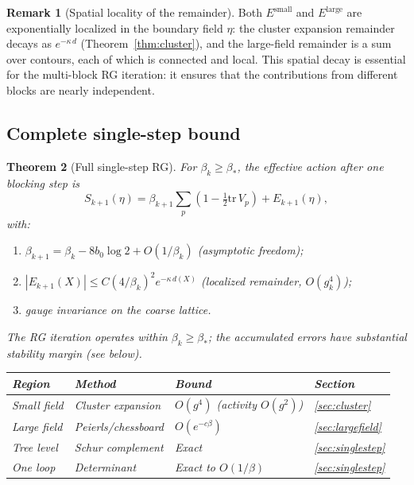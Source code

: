 \documentclass[11pt]{article}
\newtheorem{theorem}{Theorem}[section]
\theoremstyle{definition}
\newtheorem{remark}[theorem]{Remark}
\newcommand{\tr}{\mathrm{tr}}
\begin{document}
\begin{remark}[Spatial locality of the remainder]
Both $E^{\mathrm{small}}$ and $E^{\mathrm{large}}$ are exponentially
localized in the boundary field $\eta$: the cluster expansion
remainder decays as $e^{-\kappa\,d}$ (Theorem~\ref{thm:cluster}), and
the large-field remainder is a sum over contours, each of which is
connected and local.  This spatial decay is essential for the
multi-block RG iteration: it ensures that the contributions from
different blocks are nearly independent.
\end{remark}

\subsection{Complete single-step bound}

\begin{theorem}[Full single-step RG]\label{thm:singlestep}
For $\beta_k\ge\beta_*$, the effective action after one blocking step is
\begin{equation}
S_{k+1}(\eta)=\beta_{k+1}\sum_p(1-\tfrac{1}{2}\tr\,V_p)+E_{k+1}(\eta),
\end{equation}
with:
\begin{enumerate}[nosep,label=(\roman*)]
\item $\beta_{k+1}=\beta_k-8b_0\log 2+O(1/\beta_k)$
(asymptotic freedom);
\item $|E_{k+1}(X)|\le C(4/\beta_k)^2 e^{-\kappa\,d(X)}$
(localized remainder, $O(g_k^4)$);
\item gauge invariance on the coarse lattice.
\end{enumerate}
The RG iteration operates within $\beta_k\ge\beta_*$;
the accumulated errors have substantial stability margin (see below).

\begin{center}
\begin{tabular}{llll}
\toprule
\textbf{Region} & \textbf{Method} & \textbf{Bound} & \textbf{Section}\\
\midrule
Small field & Cluster expansion & $O(g^4)$ (activity $O(g^2)$) & \ref{sec:cluster}\\
Large field & Peierls/chessboard & $O(e^{-c\beta})$ &
\ref{sec:largefield}\\
Tree level & Schur complement & Exact & \ref{sec:singlestep}\\
One loop & Determinant & Exact to $O(1/\beta)$ & \ref{sec:singlestep}\\
\bottomrule
\end{tabular}
\end{center}
\end{theorem}
\end{document}
